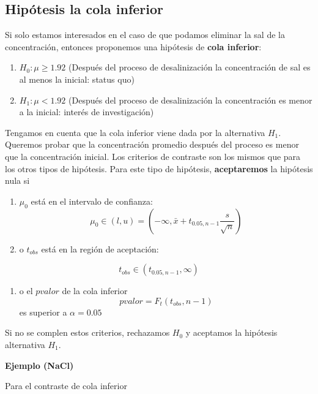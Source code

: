 \documentclass[
]{book}
\providecommand{\tightlist}{%
  \setlength{\itemsep}{0pt}\setlength{\parskip}{0pt}}
\begin{document}
\hypertarget{hipuxf3tesis-la-cola-inferior}{%
\subsection{Hipótesis la cola inferior}\label{hipuxf3tesis-la-cola-inferior}}

Si solo estamos interesados en el caso de que podamos eliminar la sal de la concentración, entonces proponemos una hipótesis de \textbf{cola inferior}:

\begin{enumerate}
\def\labelenumi{\alph{enumi}.}
\tightlist
\item
  \(H_0:\mu \geq 1.92\) (Después del proceso de desalinización la concentración de sal es al menos la inicial: status quo)
\item
  \(H_1:\mu < 1.92\) (Después del proceso de desalinización la concentración es menor a la inicial: interés de investigación)
\end{enumerate}

Tengamos en cuenta que la cola inferior viene dada por la alternativa \(H_1\). Queremos probar que la concentración promedio después del proceso es menor que la concentración inicial. Los criterios de contraste son los mismos que para los otros tipos de hipótesis. Para este tipo de hipótesis, \textbf{aceptaremos} la hipótesis nula si

\begin{enumerate}
\def\labelenumi{\arabic{enumi}.}
\item
  \(\mu_0\) está en el intervalo de confianza:
  \[\mu_0\in (l,u)=(-\infty, \bar{x}+t_{0.05,n-1} \frac{s}{\sqrt{n}})\]
\item
  o \(t_{obs}\) está en la región de aceptación:
\end{enumerate}

\[t_{obs}\in (t_{0.05,n-1}, \infty)\]

\begin{enumerate}
\def\labelenumi{\arabic{enumi}.}
\setcounter{enumi}{2}
\tightlist
\item
  o el \(pvalor\) de la cola inferior
  \[pvalor=F_t(t_{obs},n-1)\]
  es superior a \(\alpha=0.05\)
\end{enumerate}

Si no se complen estos criterios, rechazamos \(H_0\) y aceptamos la hipótesis alternativa \(H_1\).

\textbf{Ejemplo (NaCl)}

Para el contraste de cola inferior
\end{document}

